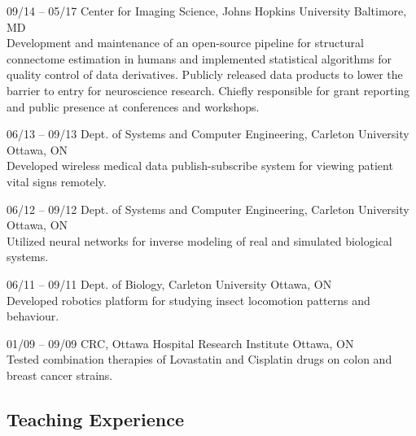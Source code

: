 \documentclass[]{friggeri-cv} %
\begin{document}
\begin{entrylist}
\entry
{09/14 -- 05/17}
{Center for Imaging Science, Johns Hopkins University}
{Baltimore, MD}
{\\
Development and maintenance of an open-source pipeline for structural connectome estimation in humans
and implemented statistical algorithms for quality control of data derivatives. Publicly released data
products to lower the barrier to entry for neuroscience research. Chiefly responsible for grant reporting
and public presence at conferences and workshops.}

\end{entrylist}
\begin{entrylist}
\entry
{06/13 -- 09/13}
{Dept. of Systems and Computer Engineering, Carleton University}
{Ottawa, ON}
{\\
Developed wireless medical data publish-subscribe system for viewing patient vital signs remotely.}

\entry
{06/12 -- 09/12}
{Dept. of Systems and Computer Engineering, Carleton University}
{Ottawa, ON}
{\\
Utilized neural networks for inverse modeling of real and simulated biological systems.}

\entry
{06/11 -- 09/11}
{Dept. of Biology, Carleton University}
{Ottawa, ON}
{\\
Developed robotics platform for studying insect locomotion patterns and behaviour.}

\entry
{01/09 -- 09/09}
{CRC, Ottawa Hospital Research Institute}
{Ottawa, ON}
{\\
Tested combination therapies of Lovastatin and Cisplatin drugs on colon and breast cancer strains.}
\end{entrylist}

\subsection{Teaching Experience}
\end{document}

